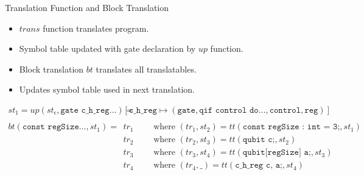 \begin{frame}{Translation Function and Block Translation}
    \begin{itemize}
        \item $trans$ function translates program.
        \item Symbol table updated with gate declaration by $up$ function.
        \item Block translation $bt$ translates all translatables.
        \item Updates symbol table used in next translation.
    \end{itemize}
    \Large
    \begin{align*}
        st_1 = up(st_\epsilon, \texttt{gate c\_h\_reg} \dots) =& \ 
        [ \texttt{c\_h\_reg} \mapsto (\texttt{gate}, \texttt{qif control do} \dots, \texttt{control}, \texttt{reg})  ]\\
        &\\
        bt(\texttt{const regSize} \dots, st_1) =& \ tr_1 \quad \quad \text{ where } (tr_1, st_2) = tt(\texttt{const regSize : int = 3;}, st_1)\\ 
                                                & \ tr_2 \quad \quad \text{ where } (tr_2, st_3) = tt(\texttt{qubit c;}, st_2)\\ 
                                                & \ tr_3 \quad \quad \text{ where } (tr_3, st_4) = tt(\texttt{qubit[regSize] a;}, st_3)\\ 
                                                & \ tr_4 \quad \quad \text{ where } (tr_4, \_) = tt(\texttt{c\_h\_reg c, a;}, st_4)
    \end{align*}
\end{frame}

